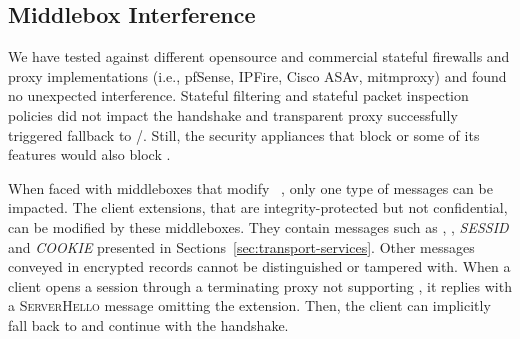 



\subsection{Middlebox Interference}
\label{sec:middlebox}

We have tested \tcpls against different opensource and commercial 
stateful
firewalls and proxy implementations (i.e., pfSense, IPFire, Cisco ASAv,
mitmproxy) and found no unexpected interference. Stateful filtering and stateful
packet inspection policies did not impact the \tcpls handshake and transparent 
\tls
proxy successfully triggered \tcpls fallback to \tls/\tcp. Still, the security
appliances that block  or some of its features
\cite{lee2019matls,Bock_China,raman2020measuring} would also block \tcpls.

When faced with middleboxes that modify ~\cite{Bock_China,raman2020measuring}, only one type of \tcpls 
messages can be impacted. The client \tls extensions, that are 
integrity-protected but not confidential, can be modified by these middleboxes. 
They contain messages such as \hello, \join, \textit{SESSID} and 
\textit{COOKIE} presented 
in Sections~\ref{sec:transport-services}. Other messages 
conveyed in encrypted \tls records cannot be distinguished or tampered with.
When a client opens a \tcpls session
through a \tls terminating proxy not supporting \tcpls, it replies 
with 
a \textsc{ServerHello} message omitting the \hello extension. Then, the client 
can implicitly fall back to \tls and continue with the handshake.

